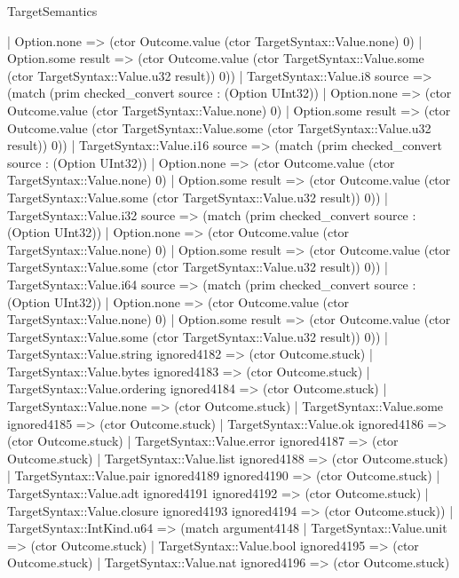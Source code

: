 \begin{lexlean}{TargetSemantics}
\begin{semanticmodule}
{              | Option.none => (ctor Outcome.value (ctor TargetSyntax::Value.none) 0)
              | Option.some result => (ctor Outcome.value (ctor TargetSyntax::Value.some (ctor TargetSyntax::Value.u32 result)) 0))
            | TargetSyntax::Value.i8 source => (match (prim checked_convert source : (Option UInt32))
              | Option.none => (ctor Outcome.value (ctor TargetSyntax::Value.none) 0)
              | Option.some result => (ctor Outcome.value (ctor TargetSyntax::Value.some (ctor TargetSyntax::Value.u32 result)) 0))
            | TargetSyntax::Value.i16 source => (match (prim checked_convert source : (Option UInt32))
              | Option.none => (ctor Outcome.value (ctor TargetSyntax::Value.none) 0)
              | Option.some result => (ctor Outcome.value (ctor TargetSyntax::Value.some (ctor TargetSyntax::Value.u32 result)) 0))
            | TargetSyntax::Value.i32 source => (match (prim checked_convert source : (Option UInt32))
              | Option.none => (ctor Outcome.value (ctor TargetSyntax::Value.none) 0)
              | Option.some result => (ctor Outcome.value (ctor TargetSyntax::Value.some (ctor TargetSyntax::Value.u32 result)) 0))
            | TargetSyntax::Value.i64 source => (match (prim checked_convert source : (Option UInt32))
              | Option.none => (ctor Outcome.value (ctor TargetSyntax::Value.none) 0)
              | Option.some result => (ctor Outcome.value (ctor TargetSyntax::Value.some (ctor TargetSyntax::Value.u32 result)) 0))
            | TargetSyntax::Value.string ignored4182 => (ctor Outcome.stuck)
            | TargetSyntax::Value.bytes ignored4183 => (ctor Outcome.stuck)
            | TargetSyntax::Value.ordering ignored4184 => (ctor Outcome.stuck)
            | TargetSyntax::Value.none => (ctor Outcome.stuck)
            | TargetSyntax::Value.some ignored4185 => (ctor Outcome.stuck)
            | TargetSyntax::Value.ok ignored4186 => (ctor Outcome.stuck)
            | TargetSyntax::Value.error ignored4187 => (ctor Outcome.stuck)
            | TargetSyntax::Value.list ignored4188 => (ctor Outcome.stuck)
            | TargetSyntax::Value.pair ignored4189 ignored4190 => (ctor Outcome.stuck)
            | TargetSyntax::Value.adt ignored4191 ignored4192 => (ctor Outcome.stuck)
            | TargetSyntax::Value.closure ignored4193 ignored4194 => (ctor Outcome.stuck))
          | TargetSyntax::IntKind.u64 => (match argument4148
            | TargetSyntax::Value.unit => (ctor Outcome.stuck)
            | TargetSyntax::Value.bool ignored4195 => (ctor Outcome.stuck)
            | TargetSyntax::Value.nat ignored4196 => (ctor Outcome.stuck)
}
\end{semanticmodule}
\end{lexlean}
